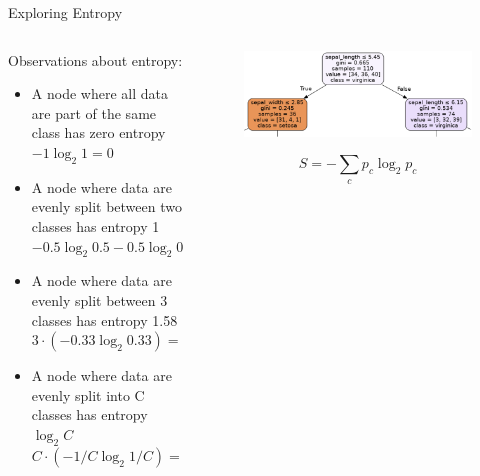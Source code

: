 \documentclass[aspectratio=169]{../latex_main/tntbeamer}  %
\begin{document}
	
	\begin{frame}{Exploring Entropy}
	    \begin{columns}
	        \begin{column}{.7\textwidth}
	                Observations about entropy:
	                \begin{itemize}
	                    \item A node where all data are part of the \alert{same class} has zero entropy \\ $-1 \log_2 1 = 0$
	                    \item A node where data are \alert{evenly split between two classes} has
	                    entropy 1 \\$-0.5 \log_2{ 0.5} - 0.5\log_2{ 0.5}= 1$
	                    \item A node where data are \alert{evenly split between 3 classes} has entropy 1.58 \\$3 \cdot (-0.33 \log_2{ 0.33}) = 1.58$
	                    \item A node where data are \alert{evenly split into C classes} has entropy $\log_2{C}$ \\ 
	                    $C \cdot (-1 /C \log_2 1/C) = - \log_2 1/C = \log_2 C$
	                \end{itemize}
	        \end{column}
	        
	        \begin{column}{.3\textwidth}
	                \begin{figure}
	                    \centering
	                    \includegraphics[scale=.35]{Bild47}
	                \end{figure}
	                \begin{equation*}
                          S = -\sum\limits_c p_c\log_2p_c
                    \end{equation*}
	                
	        \end{column}
	    \end{columns}
	\end{frame}
	
\end{document}

